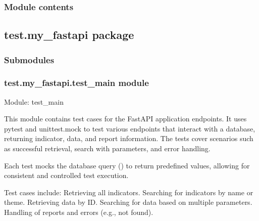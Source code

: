 \documentclass[letterpaper,10pt,english]{sphinxmanual}
\begin{document}
\subsubsection{Module contents}
\label{\detokenize{test.frontend:module-test.frontend}}\label{\detokenize{test.frontend:module-contents}}
\sphinxstepscope


\subsection{test.my\_fastapi package}
\label{\detokenize{test.my_fastapi:test-my-fastapi-package}}\label{\detokenize{test.my_fastapi::doc}}

\subsubsection{Submodules}
\label{\detokenize{test.my_fastapi:submodules}}

\subsubsection{test.my\_fastapi.test\_main module}
\label{\detokenize{test.my_fastapi:module-test.my_fastapi.test_main}}\label{\detokenize{test.my_fastapi:test-my-fastapi-test-main-module}}
\sphinxAtStartPar
Module: test\_main

\sphinxAtStartPar
This module contains test cases for the FastAPI application endpoints.
It uses pytest and unittest.mock to test various endpoints that interact
with a database, returning indicator, data, and report information. The tests
cover scenarios such as successful retrieval, search with parameters, and error handling.

\sphinxAtStartPar
Each test mocks the database query () to return predefined values,
allowing for consistent and controlled test execution.

\sphinxAtStartPar
Test cases include:
\sphinxhyphen{} Retrieving all indicators.
\sphinxhyphen{} Searching for indicators by name or theme.
\sphinxhyphen{} Retrieving data by ID.
\sphinxhyphen{} Searching for data based on multiple parameters.
\sphinxhyphen{} Handling of reports and errors (e.g., not found).
\end{document}
